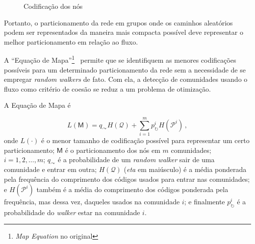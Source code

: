 \documentclass[
  article,
  11pt,
  a4paper,
  english,
  brazil,
  sumario=tradicional]{abntex2}
\begin{document}
\begin{figure}[ht]
  \centering
  \caption{Codificação dos nós}
\end{figure}

Portanto, o particionamento da rede em grupos onde os caminhos aleatórios podem ser representados da maneira mais compacta possível deve representar o melhor particionamento em relação ao fluxo.

A \enquote{Equação de Mapa}\footnote{\textit{Map Equation} no original}~\cite{Rosvall2009-sd} permite que se identifiquem as menores codificações possíveis para um determinado particionamento da rede sem a necessidade de se empregar \textit{random walkers} de fato. Com ela, a detecção de comunidades usando o fluxo como critério de coesão se reduz a um problema de otimização.

A Equação de Mapa é

\begin{equation*}
  L(\mathsf{M}) = q_\curvearrowright H(\mathcal{Q}) + \sum_{i=1}^{m}p^i_\circlearrowright H(\mathcal{P}^i)\,,
\end{equation*}
onde $L(\cdot)$ é o menor tamanho de codificação possível para representar um certo particionamento; $\mathsf{M}$ é o particionamento dos nós em $m$ comunidades; $i = 1, 2, \ldots, m$; $q_\curvearrowright$ é a probabilidade de um \textit{random walker} sair de uma comunidade e entrar em outra; $H(\mathcal{Q})$ (\textit{eta} em maiúsculo) é a média ponderada pela frequência do comprimento dos códigos usados para entrar nas comunidades; e $H(\mathcal{P}^i)$ também é a média do comprimento dos códigos ponderada pela frequência, mas dessa vez, daqueles usados na comunidade $i$; e finalmente $p^i_\circlearrowright$ é a probabilidade do \textit{walker} estar na comunidade $i$.
\end{document}
